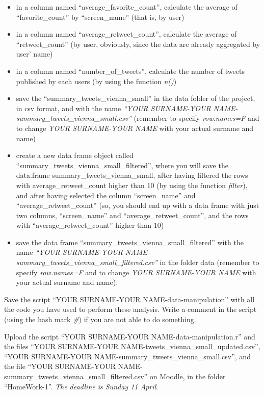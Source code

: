\documentclass[
]{article}
\begin{document}
\begin{itemize}
\begin{itemize}
    \begin{itemize}
    \item
      in a column named ``average\_favorite\_count'', calculate the average of ``favorite\_count'' by ``screen\_name'' (that is, by user)
    \item
      in a column named ``average\_retweet\_count'', calculate the average of ``retweet\_count'' (by user, obviously, since the data are already aggregated by user' name)
    \item
      in a column named ``number\_of\_tweets'', calculate the number of tweets published by each users (by using the function \emph{n()})
    \item
      save the ``summary\_tweets\_vienna\_small'' in the data folder of the project, in csv format, and with the name \emph{``YOUR SURNAME-YOUR NAME-summary\_tweets\_vienna\_small.csv''} (remember to specify \emph{row.names=F} and to change \emph{YOUR SURNAME-YOUR NAME} with your actual surname and name)
    \item
      create a new data frame object called ``summary\_tweets\_vienna\_small\_filtered'', where you will save the data.frame summary\_tweets\_vienna\_small, after having filtered the rows with average\_retweet\_count higher than 10 (by using the function \emph{filter}), and after having selected the column ``screen\_name'' and ``average\_retweet\_count'' (so, you should end up with a data frame with just two columns, ``screen\_name'' and ``average\_retweet\_count'', and the rows with ``average\_retweet\_count'' higher than 10)
    \item
      save the data frame ``summary\_tweets\_vienna\_small\_filtered'' with the name \emph{``YOUR SURNAME-YOUR NAME-summary\_tweets\_vienna\_small\_filtered.csv''} in the folder data (remember to specify \emph{row.names=F} and to change \emph{YOUR SURNAME-YOUR NAME} with your actual surname and name).
    \end{itemize}
  \end{itemize}
\end{itemize}

Save the script ``YOUR SURNAME-YOUR NAME-data-manipulation'' with all the code you have used to perform these analysis. Write a comment in the script (using the hash mark \emph{\#}) if you are not able to do something.

Upload the script ``YOUR SURNAME-YOUR NAME-data-manipulation.r'' and the files ``YOUR SURNAME-YOUR NAME-tweets\_vienna\_small\_updated.csv'', ``YOUR SURNAME-YOUR NAME-summary\_tweets\_vienna\_small.csv'', and the file ``YOUR SURNAME-YOUR NAME-summary\_tweets\_vienna\_small\_filtered.csv'' on Moodle, in the folder ``HomeWork-1''. \emph{The deadline is Sunday 11 April}.
\end{document}
